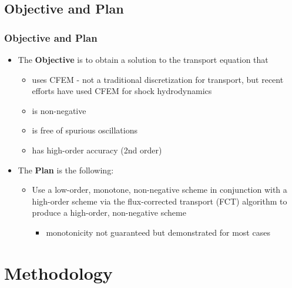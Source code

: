 \documentclass{beamer}
\begin{document}
\subsection{Objective and Plan}
\begin{frame}
\frametitle{Objective and Plan}

\begin{itemize}
   \item The \textbf{Objective} is to obtain a solution to the transport equation that
      \begin{itemize}
         \item uses CFEM - not a traditional discretization for transport,
            but recent efforts have used CFEM for shock hydrodynamics
         \item is non-negative
         \item is free of spurious oscillations
         \item has high-order accuracy (2nd order)
      \end{itemize}
   \item The \textbf{Plan} is the following:
   \begin{itemize}
      \item Use a low-order, monotone, non-negative scheme in conjunction with
      a high-order scheme via the flux-corrected transport (FCT) algorithm
      to produce a high-order, non-negative scheme
      \begin{itemize}
         \item monotonicity not guaranteed but demonstrated for most cases
      \end{itemize}
   \end{itemize}
\end{itemize}

\end{frame}
\section{Methodology}
\end{document}

